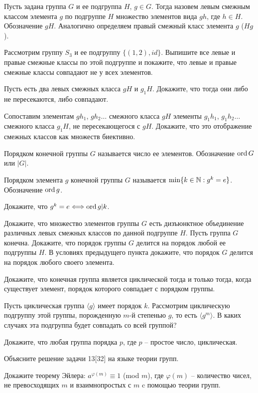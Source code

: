 \documentclass[12pt]{article}
\begin{document}
	

	Пусть задана группа $G$ и ее подгруппа $H$, $g \in G$. Тогда назовем левым смежным классом элемента $g$ по подгруппе $H$ множество элементов вида $gh$, где $h \in H$. Обозначение $gH$. Аналогично определяем правый смежный класс элемента $g$ ($Hg$).
	
	Рассмотрим группу $S_3$ и ее подгруппу $\{(1,2), id\}$. Выпишите все левые и правые смежные классы по этой подгруппе и покажите, что левые и правые смежные классы совпадают не у всех элементов.
	
	Пусть есть два левых смежных класса $gH$ и $g_1H$. Докажите, что тогда они либо не пересекаются, либо совпадают.
	
	Сопоставим элементам $gh_1$, $gh_2\dots$ смежного класса $gH$ элементы $g_1h_1$, $g_1h_2\dots$ смежного класса $g_1H$, не пересекающегося с $gH$. Докажите, что это отображение смежных классов как множеств биективно.
	
	Порядком конечной группы $G$ называется число ее элементов. Обозначение $\operatorname{ord} G$ или $|G|$.

	Порядком элемента $g$ конечной группы $G$ называется $\min \{ k \in \mathbb{N} : g^k=e\}$. Обозначение $\operatorname{ord} g$.
	
	Докажите, что $g^k=e \Longleftrightarrow \operatorname{ord} g|k$.
	
	 Докажите, что множество элементов группы $G$ есть дизъюнктное объединение различных левых смежных классов по данной подгруппе $H$.
	 Пусть группа $G$ конечна. Докажите, что порядок группы $G$ делится на порядок любой ее подгруппы $H$.
	 В условиях предыдущего пункта докажите, что порядок $G$ делится на порядок любого своего элемента.
	
	Докажите, что конечная группа является циклической тогда и только тогда, когда существует элемент, порядок которого совпадает с порядком группы.
	
	Пусть циклическая группа $\langle g \rangle$ имеет порядок $k$. Рассмотрим циклическую подгруппу этой группы, порожденную $m$-й степенью $g$, то есть $\langle g^m\rangle$. В каких случаях эта подгруппа будет совпадать со всей группой?
	
	Докажите, что любая группа порядка $p$, где $p$ -- простое число, циклическая.
	
	Объясните решение задачи 13[32] на языке теории групп.
	
	Докажите теорему Эйлера: $a^{\varphi(m)}\equiv1$ (mod $m$), где $\varphi(m)$ -- количество чисел, не превосходящих $m$ и взаимнопростых с $m$ c помощью теории групп.

\vfill

\GenXMLW
\end{document}

